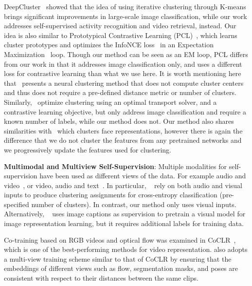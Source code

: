 \documentclass[10pt,twocolumn,letterpaper]{article}
\begin{document}
DeepCluster~\cite{caron2018deep, caron2019unsupervised} showed that the idea of using iterative clustering through K-means brings significant improvements in large-scale image classification, while our work addresses self-supervised activity recognition and video retrieval, instead. Our idea is also similar to Prototypical Contrastive Learning (PCL)~\cite{PCL}, which learns cluster prototypes and optimizes the InfoNCE loss~\cite{oord2019representation} in an Expectation Maximization~\cite{EM_algo} loop.  Though our method can be seen as an EM loop, PCL differs from our work in that it addresses image classification only, and uses a different loss for contrastive learning than what we use here. It is worth mentioning here that~\cite{hsu2016neural} presents a neural clustering method that does not compute cluster centers and thus does not require a pre-defined distance metric or number of clusters. Similarly,~\cite{YM.2020Self-labelling, swav} optimize clustering using an optimal transport solver, and a contrastive learning objective, but only address image classification and require a known number of labels, while our method does not.
Our method also shares similarities with~\cite{face_finch} which clusters face representations, however there is again the difference that we do not cluster the features from any pretrained networks and we progressively update the features used for clustering. 



\textbf{Multimodal and Multiview Self-Supervision}: Multiple modalities for self-supervision have been used as different views of the data. For example audio and video~\cite{alwassel2020selfsupervised, arandjelovic2017look, korbar, label_multimodal, cross_modal, spatio_tempoal_statistics}, or video, audio and text~\cite{akbari2021vatt}.
In particular, ~\cite{label_multimodal, cross_modal} rely on both audio and visual inputs to produce clustering assignments for cross-entropy classification (pre-specified number of clusters). In contrast, our method only uses visual inputs. Alternatively, ~\cite{CLIP} uses image captions as supervision to pretrain a visual model for image representation learning, but it requires additional labels for training data.


Co-training based on RGB videos and optical flow was examined in CoCLR~\cite{coclr}, which is one of the best-performing methods for video representation. \cite{CoCon2021} also adopts a multi-view training scheme similar to that of CoCLR\cite{coclr} by ensuring that the embeddings of different views such as flow, segmentation masks, and poses are consistent with respect to their distances between the same clips. 
\end{document}
